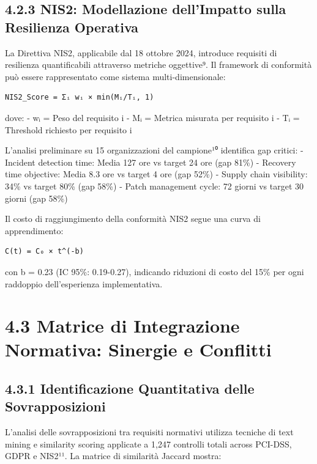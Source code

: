 \documentclass[12pt,a4paper,oneside]{book}
\numberwithin{figure}{chapter} %
\numberwithin{table}{chapter}  %
\begin{document}
\subsection{4.2.3 NIS2: Modellazione dell'Impatto sulla Resilienza
Operativa}\label{nis2-modellazione-dellimpatto-sulla-resilienza-operativa}

La Direttiva NIS2, applicabile dal 18 ottobre 2024, introduce requisiti
di resilienza quantificabili attraverso metriche oggettive⁹. Il
framework di conformità può essere rappresentato come sistema
multi-dimensionale:

\begin{verbatim}
NIS2_Score = Σᵢ wᵢ × min(Mᵢ/Tᵢ, 1)
\end{verbatim}

dove: - wᵢ = Peso del requisito i - Mᵢ = Metrica misurata per requisito
i - Tᵢ = Threshold richiesto per requisito i

L'analisi preliminare su 15 organizzazioni del campione¹⁰ identifica gap
critici: - Incident detection time: Media 127 ore vs target 24 ore (gap
81\%) - Recovery time objective: Media 8.3 ore vs target 4 ore (gap
52\%) - Supply chain visibility: 34\% vs target 80\% (gap 58\%) - Patch
management cycle: 72 giorni vs target 30 giorni (gap 58\%)

Il costo di raggiungimento della conformità NIS2 segue una curva di
apprendimento:

\begin{verbatim}
C(t) = C₀ × t^(-b)
\end{verbatim}

con b = 0.23 (IC 95\%: 0.19-0.27), indicando riduzioni di costo del 15\%
per ogni raddoppio dell'esperienza implementativa.

\section{4.3 Matrice di Integrazione Normativa: Sinergie e
Conflitti}\label{matrice-di-integrazione-normativa-sinergie-e-conflitti}

\subsection{4.3.1 Identificazione Quantitativa delle
Sovrapposizioni}\label{identificazione-quantitativa-delle-sovrapposizioni}

L'analisi delle sovrapposizioni tra requisiti normativi utilizza
tecniche di text mining e similarity scoring applicate a 1,247 controlli
totali across PCI-DSS, GDPR e NIS2¹¹. La matrice di similarità Jaccard
mostra:
\end{document}
